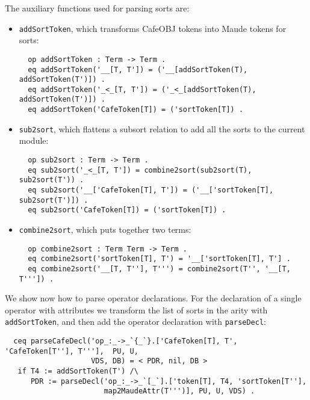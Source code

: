 The auxiliary functions used for parsing sorts are:
\begin{itemize}
\item
\verb"addSortToken", which transforms CafeOBJ tokens into Maude tokens for sorts:

{\codesize
\begin{verbatim}
  op addSortToken : Term -> Term .
  eq addSortToken('__[T, T']) = ('__[addSortToken(T), addSortToken(T')]) .
  eq addSortToken('_<_[T, T']) = ('_<_[addSortToken(T), addSortToken(T')]) .
  eq addSortToken('CafeToken[T]) = ('sortToken[T]) .
\end{verbatim}
}

\item
\verb"sub2sort", which flattens a subsort relation to add all the sorts to
the current module:

{\codesize
\begin{verbatim}
  op sub2sort : Term -> Term .
  eq sub2sort('_<_[T, T']) = combine2sort(sub2sort(T), sub2sort(T')) .
  eq sub2sort('__['CafeToken[T], T']) = ('__['sortToken[T], sub2sort(T')]) .
  eq sub2sort('CafeToken[T]) = ('sortToken[T]) .
\end{verbatim}
}

\item
\verb"combine2sort", which puts together two terms:

{\codesize
\begin{verbatim}
  op combine2sort : Term Term -> Term .
  eq combine2sort('sortToken[T], T') = '__['sortToken[T], T'] .
  eq combine2sort('__[T, T''], T''') = combine2sort(T'', '__[T, T''']) .
\end{verbatim}
}

\end{itemize}

We show now how to parse operator declarations. For the declaration of a single operator
with attributes we transform the list of sorts in the arity with \verb"addSortToken",
and then add the operator declaration with \verb"parseDecl":

{\codesize
\begin{verbatim}
  ceq parseCafeDecl('op_:_->_`{_`}.['CafeToken[T], T', 'CafeToken[T''], T'''],  PU, U,
                    VDS, DB) = < PDR, nil, DB >
   if T4 := addSortToken(T') /\
      PDR := parseDecl('op_:_->_`[_`].['token[T], T4, 'sortToken[T''],
                       map2MaudeAttr(T''')], PU, U, VDS) .
\end{verbatim}
}

